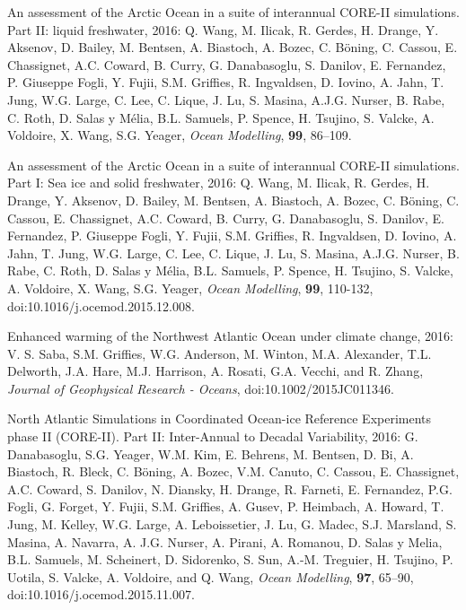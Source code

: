 \begin{etaremune}
\item An assessment of the Arctic Ocean in a suite of interannual
  CORE-II simulations. Part II: liquid freshwater, 2016: Q. Wang,
  M. Ilicak, R. Gerdes, H. Drange, Y. Aksenov, D. Bailey, M. Bentsen,
  A. Biastoch, A. Bozec, C. B\"{o}ning, C.  Cassou, E. Chassignet,
  A.C. Coward, B. Curry, G. Danabasoglu, S. Danilov, E. Fernandez,
  P. Giuseppe Fogli, Y. Fujii, S.M. Grif\/f\/ies, R. Ingvaldsen,
  D. Iovino, A. Jahn, T. Jung, W.G. Large, C. Lee, C. Lique, J. Lu,
  S. Masina, A.J.G. Nurser, B. Rabe, C. Roth, D. Salas y M\'elia,
  B.L. Samuels, P. Spence, H. Tsujino, S. Valcke, A. Voldoire,
  X. Wang, S.G. Yeager, {\it Ocean Modelling}, {\bf 99}, 86--109.

\item An assessment of the Arctic Ocean in a suite of interannual
  CORE-II simulations. Part I: Sea ice and solid freshwater, 2016:
  Q. Wang, M. Ilicak, R. Gerdes, H. Drange, Y. Aksenov, D. Bailey,
  M. Bentsen, A. Biastoch, A. Bozec, C. B\"{o}ning, C.  Cassou,
  E. Chassignet, A.C. Coward, B. Curry, G. Danabasoglu, S. Danilov,
  E. Fernandez, P. Giuseppe Fogli, Y. Fujii, S.M. Grif\/f\/ies,
  R. Ingvaldsen, D. Iovino, A. Jahn, T. Jung, W.G. Large, C. Lee,
  C. Lique, J. Lu, S. Masina, A.J.G. Nurser, B. Rabe, C. Roth,
  D. Salas y M\'elia, B.L. Samuels, P. Spence, H. Tsujino, S. Valcke,
  A. Voldoire, X. Wang, S.G. Yeager, {\it Ocean Modelling}, {\bf 99},
  110-132, doi:10.1016/j.ocemod.2015.12.008.

\item Enhanced warming of the Northwest Atlantic Ocean under climate
  change, 2016: V. S. Saba, S.M. Grif\/f\/ies, W.G. Anderson,
  M. Winton, M.A. Alexander, T.L. Delworth, J.A. Hare, M.J. Harrison,
  A. Rosati, G.A. Vecchi, and R. Zhang, {\it Journal of Geophysical
    Research - Oceans}, doi:10.1002/2015JC011346.

\item North Atlantic Simulations in Coordinated Ocean-ice Reference
  Experiments phase II (CORE-II). Part II: Inter-Annual to Decadal
  Variability, 2016: G. Danabasoglu, S.G. Yeager, W.M. Kim,
  E. Behrens, M. Bentsen, D. Bi, A. Biastoch, R. Bleck, C. B\"{o}ning,
  A. Bozec, V.M. Canuto, C. Cassou, E. Chassignet, A.C. Coward,
  S. Danilov, N. Diansky, H. Drange, R. Farneti, E. Fernandez,
  P.G. Fogli, G. Forget, Y. Fujii, S.M. Grif\/f\/ies, A. Gusev,
  P. Heimbach, A. Howard, T. Jung, M. Kelley, W.G. Large,
  A. Leboissetier, J. Lu, G. Madec, S.J. Marsland, S. Masina,
  A. Navarra, A. J.G. Nurser, A. Pirani, A. Romanou, D. Salas y Melia,
  B.L. Samuels, M. Scheinert, D. Sidorenko, S. Sun, A.-M. Treguier,
  H. Tsujino, P. Uotila, S. Valcke, A. Voldoire, and Q. Wang, {\it Ocean Modelling}, {\bf 97}, 65--90, 
doi:10.1016/j.ocemod.2015.11.007.


\end{etaremune}
